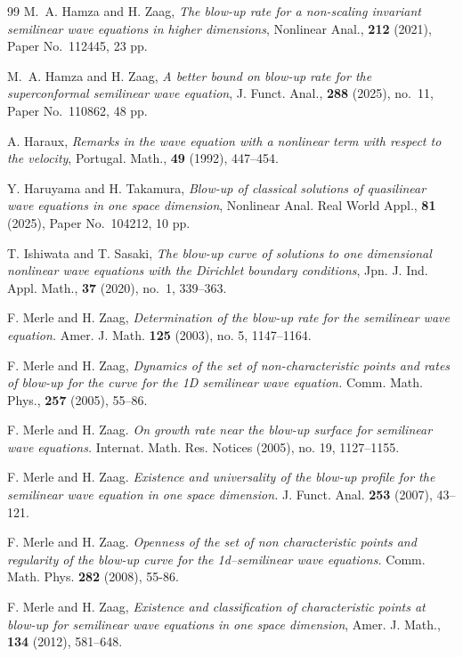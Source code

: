 \documentclass[
  sn-mathphys-num,
  colorlinks,
  linkcolor=darkmagenta,
  citecolor=rufous,
  urlcolor=zaffre,
  hypertexnames=false
]{sn-jnl}
\numberwithin{equation}{section}
\begin{document}
\begin{thebibliography}{99}
M.~A. Hamza and H. Zaag, \textit{The blow-up rate for a non-scaling invariant semilinear wave equations in higher dimensions}, Nonlinear Anal., \textbf{212} (2021), Paper No.~112445, 23 pp.

M.~A. Hamza and H. Zaag, \textit{A better bound on blow-up rate for the superconformal semilinear wave equation}, J. Funct. Anal., \textbf{288} (2025), no.~11, Paper No.~110862, 48 pp.

A. Haraux, \textit{Remarks in the wave equation with a nonlinear term with respect to the velocity}, Portugal. Math., \textbf{49} (1992), 447–454.

Y. Haruyama and H. Takamura, \textit{Blow-up of classical solutions of quasilinear wave equations in one space dimension}, Nonlinear Anal. Real World Appl., \textbf{81} (2025), Paper No.~104212, 10 pp.

T. Ishiwata and T. Sasaki, \textit{The blow-up curve of solutions to one dimensional nonlinear wave equations with the Dirichlet boundary conditions}, Jpn. J. Ind. Appl. Math., \textbf{37} (2020), no.~1, 339–363.

F. Merle and H. Zaag, \textit{Determination of the blow-up rate for the semilinear wave equation.} Amer. J. Math. \textbf{125} (2003), no. 5, 1147--1164.

F. Merle and H. Zaag, \textit{Dynamics of the set of non-characteristic points and rates of blow-up for the curve for the 1D semilinear wave equation.} Comm. Math. Phys., \textbf{257} (2005), 55–86.

F. Merle and H. Zaag. \textit{On growth rate near the blow-up surface for semilinear wave equations.} Internat. Math. Res. Notices (2005), no. 19, 1127--1155.

F. Merle and H. Zaag. \textit{Existence and universality of the blow-up profile for the semilinear wave equation in one space dimension.} J. Funct. Anal. \textbf{253} (2007), 43--121.

F. Merle and H. Zaag. \textit{Openness of the set of non characteristic points and regularity of the blow-up curve for the 1d--semilinear wave equations.} Comm. Math. Phys. \textbf{282} (2008), 55-86.

F. Merle and H. Zaag, \textit{Existence and classification of characteristic points at blow-up for semilinear wave equations in one space dimension}, Amer. J. Math., \textbf{134} (2012), 581–648.


\end{thebibliography}
\end{document}
